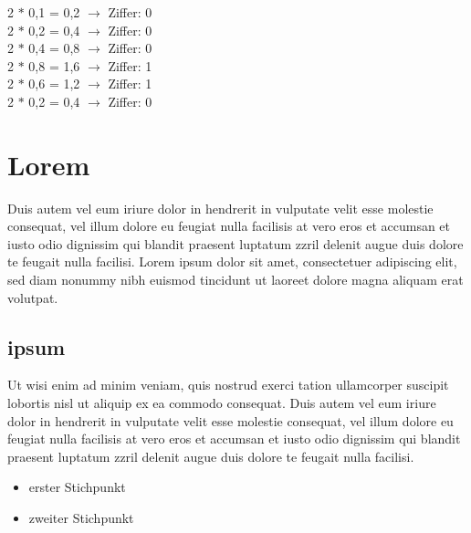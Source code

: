 \begin{center}
2 $\ast$ 0,1 = 0,2 $\rightarrow$ Ziffer: 0 \\
2 $\ast$ 0,2 = 0,4 $\rightarrow$ Ziffer: 0 \\
2 $\ast$ 0,4 = 0,8 $\rightarrow$ Ziffer: 0 \\
2 $\ast$ 0,8 = 1,6 $\rightarrow$ Ziffer: 1 \\
2 $\ast$ 0,6 = 1,2 $\rightarrow$ Ziffer: 1 \\
2 $\ast$ 0,2 = 0,4 $\rightarrow$ Ziffer: 0 \\
\end{center}

\section{Lorem}
Duis autem vel eum iriure dolor in hendrerit in vulputate velit esse molestie consequat, vel illum dolore eu feugiat nulla facilisis at vero eros et accumsan et iusto odio dignissim qui blandit praesent luptatum zzril delenit augue duis dolore te feugait nulla facilisi. Lorem ipsum dolor sit amet, consectetuer adipiscing elit, sed diam nonummy nibh euismod tincidunt ut laoreet dolore magna aliquam erat volutpat.   

\subsection{ipsum}
Ut wisi enim ad minim veniam, quis nostrud exerci tation ullamcorper suscipit lobortis nisl ut aliquip ex ea commodo consequat. Duis autem vel eum iriure dolor in hendrerit in vulputate velit esse molestie consequat, vel illum dolore eu feugiat nulla facilisis at vero eros et accumsan et iusto odio dignissim qui blandit praesent luptatum zzril delenit augue duis dolore te feugait nulla facilisi.   

\begin{itemize}
    \item erster Stichpunkt
    \item zweiter Stichpunkt
\end{itemize}


 